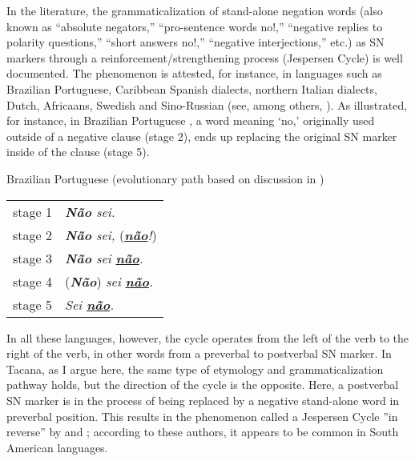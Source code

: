 \documentclass[output=paper]{langsci/langscibook}
\begin{document}
In the literature, the grammaticalization of stand-alone negation words
(also known as ``absolute negators,'' ``pro-sentence words no!,''
``negative replies to polarity questions,'' ``short answers no!,''
``negative interjections,'' etc.) as SN markers through a
reinforcement\slash strengthening process (Jespersen Cycle) is well
documented. The phenomenon is attested,
for instance, in languages such as Brazilian Portuguese, Caribbean Spanish
dialects, northern Italian dialects, Dutch, Africaans, Swedish and
Sino-Russian (see, among others,
\cites{Schwegler1988}[49]{Auwera2009}[127ff]{Veselinova2013}[155--156]{Veselinova2016}).
As illustrated, for instance, in Brazilian Portuguese %
, a word meaning `no,' originally used outside of a negative
clause (stage 2), ends up replacing the original SN marker inside of the
clause (stage 5).
%
\begin{exe}\ex\label{ex:tacana-portuguese} Brazilian
Portuguese %
 (evolutionary path based on discussion in
\citealt[149--150]{Creissels2006})\\
\begin{tabularx}{.8\textwidth}{l l}
\tablevspace
stage 1 & \textit{\textbf{Não} sei.}    \\
stage 2 & \textit{\textbf{Não} sei,} (\textit{\textbf{\underline{não}}!})  \\
stage 3 & \textit{\textbf{Não} sei \textbf{\underline{não}}.} \\
stage 4 & (\textit{\textbf{Não}}) \textit{{sei} \textbf{\underline{não}}.}   \\
stage 5 & \textit{Sei \textbf{\underline{não}}.}
\end{tabularx}\end{exe}


In all these languages, however, the cycle operates from the left of the
verb to the right of the verb, in other words from a preverbal to
postverbal SN marker. In Tacana, as I argue here, the same type of
etymology and grammaticalization pathway holds, but the direction of the
cycle is the opposite. Here, a postverbal SN marker is in the process of
being replaced by a negative stand-alone word in preverbal position. This
results in the phenomenon called a Jespersen Cycle ''in reverse'' by 
\citet{AuweraVossen2016} and \citet{Vossen2016}; according to
these authors, it appears to be common in South American languages.
\end{document}
